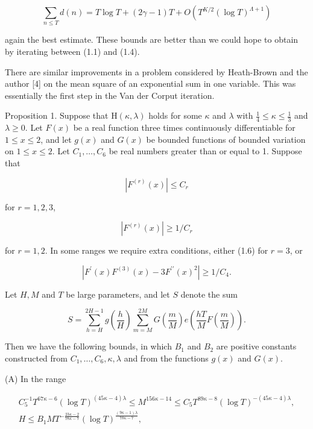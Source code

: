 \documentclass[10pt]{article}
\begin{document}
$$
\sum_{n \leqslant T} d(n)=T \log T+(2 \gamma-1) T+O\left(T^{K / 2}(\log T)^{\Lambda+1}\right)
$$

again the best estimate. These bounds are better than we could hope to obtain by iterating between (1.1) and (1.4).

There are similar improvements in a problem considered by Heath-Brown and the author [4] on the mean square of an exponential sum in one variable. This was essentially the first step in the Van der Corput iteration.

Proposition 1. Suppose that $\mathrm{H}(\kappa, \lambda)$ holds for some $\kappa$ and $\lambda$ with $\frac{1}{4} \leqslant \kappa \leqslant \frac{1}{3}$ and $\lambda \geqslant 0$. Let $F(x)$ be a real function three times continuously differentiable for $1 \leqslant x \leqslant 2$, and let $g(x)$ and $G(x)$ be bounded functions of bounded variation on $1 \leqslant x \leqslant 2$. Let $C_{1}, \ldots, C_{6}$ be real numbers greater than or equal to 1. Suppose that


\begin{equation*}
\left|F^{(r)}(x)\right| \leqslant C_{r} \tag{1.5}
\end{equation*}


for $r=1,2,3$,


\begin{equation*}
\left|F^{(r)}(x)\right| \geqslant 1 / C_{r} \tag{1.6}
\end{equation*}


for $r=1,2$. In some ranges we require extra conditions, either (1.6) for $r=3$, or


\begin{equation*}
\left|F^{\prime}(x) F^{(3)}(x)-3 F^{\prime \prime}(x)^{2}\right| \geqslant 1 / C_{4}. \tag{1.7}
\end{equation*}


Let $H, M$ and $T$ be large parameters, and let $S$ denote the sum

$$
S=\sum_{h=H}^{2 H-1} g\left(\frac{h}{H}\right) \sum_{m=M}^{2 M} G\left(\frac{m}{M}\right) e\left(\frac{h T}{M} F\left(\frac{m}{M}\right)\right).
$$

Then we have the following bounds, in which $B_{1}$ and $B_{2}$ are positive constants constructed from $C_{1}, \ldots, C_{6}, \kappa, \lambda$ and from the functions $g(x)$ and $G(x)$.

(A) In the range


\begin{gather*}
C_{5}^{-1} T^{67 \kappa-6}(\log T)^{(45 \kappa-4) \lambda} \leqslant M^{156 \kappa-14} \leqslant C_{5} T^{89 \kappa-8}(\log T)^{-(45 \kappa-4) \lambda},  \tag{1.8}\\
H \leqslant B_{1} M T^{-\frac{23 \kappa-2}{78 \kappa-7}}(\log T)^{\frac{(9 \kappa-1) \lambda}{78 \kappa-7}}, \tag{1.9}
\end{gather*}
\end{document}
